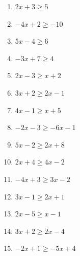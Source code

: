 \documentclass[12pt]{article}
\begin{document}
\begin{enumerate}
\def\labelenumi{\arabic{enumi}.}
\item
  \(2x + 3 \geq 5\)
\item
  \(-4x + 2 \geq -10\)
\item
  \(5x - 4 \geq 6\)
\item
  \(-3x + 7 \geq 4\)
\item
  \(2x - 3 \geq x + 2\)
\item
  \(3x + 2 \geq 2x - 1\)
\item
  \(4x - 1 \geq x + 5\)
\item
  \(-2x - 3 \geq -6x - 1\)
\item
  \(5x - 2 \geq 2x + 8\)
\item
  \(2x + 4 \geq 4x - 2\)
\item
  \(-4x + 3 \geq 3x - 2\)
\item
  \(3x - 1 \geq 2x + 1\)
\item
  \(2x - 5 \geq x - 1\)
\item
  \(3x + 2 \geq 2x - 4\)
\item
  \(-2x + 1 \geq -5x + 4\)
\end{enumerate}
\end{document}
